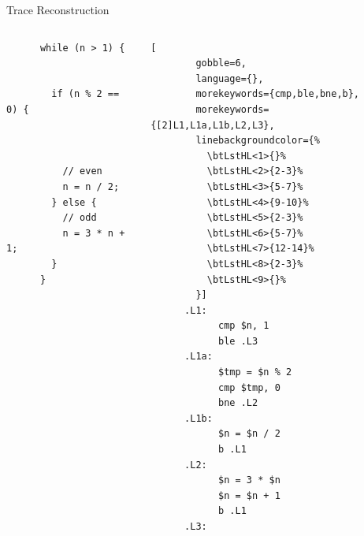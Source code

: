 \begin{frame}{Trace Reconstruction}
\begin{columns}[t]
\begin{lstlisting}
      while (n > 1) {


        if (n % 2 == 0) {



          // even
          n = n / 2;
        } else {
          // odd
          n = 3 * n + 1;
        }
      }
    \end{lstlisting}

    \column{3.3cm}
    \vskip-2pt
    \begin{lstlisting}[
        gobble=6,
        language={},
        morekeywords={cmp,ble,bne,b},
        morekeywords={[2]L1,L1a,L1b,L2,L3},
        linebackgroundcolor={%
          \btLstHL<1>{}%
          \btLstHL<2>{2-3}%
          \btLstHL<3>{5-7}%
          \btLstHL<4>{9-10}%
          \btLstHL<5>{2-3}%
          \btLstHL<6>{5-7}%
          \btLstHL<7>{12-14}%
          \btLstHL<8>{2-3}%
          \btLstHL<9>{}%
        }]
      .L1:
            cmp $n, 1
            ble .L3
      .L1a:
            $tmp = $n % 2
            cmp $tmp, 0
            bne .L2
      .L1b:
            $n = $n / 2
            b .L1
      .L2:
            $n = 3 * $n
            $n = $n + 1
            b .L1
      .L3:
    \end{lstlisting}

    \column{1cm}

    \\[-1ex]
    \\[-1ex]
    \\[-1ex]
    \\[-1ex]
    \\[-1ex]
    \\[-1ex]

    \column{1cm}

    \\[-1ex]
    \\[-1ex]
    \\[-1ex]
    \\[-1ex]
  \end{columns}
\end{frame}

